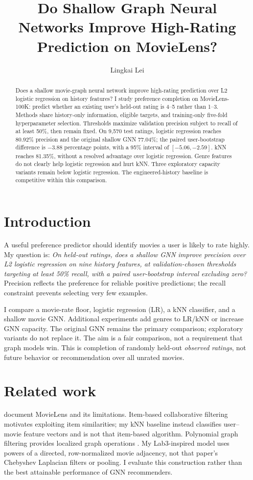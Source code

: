 \documentclass{article}
\title{Do Shallow Graph Neural Networks Improve High-Rating Prediction on MovieLens?}
\author{Lingkai Lei}
\begin{document}
\maketitle

\begin{abstract}
Does a shallow movie-graph neural network improve high-rating prediction over L2 logistic regression on history features? I study preference completion on MovieLens-100K: predict whether an existing user's held-out rating is 4--5 rather than 1--3. Methods share history-only information, eligible targets, and training-only five-fold hyperparameter selection. Thresholds maximize validation precision subject to recall of at least 50\%, then remain fixed. On 9,570 test ratings, logistic regression reaches 80.92\% precision and the original shallow GNN 77.04\%; the paired user-bootstrap difference is $-3.88$ percentage points, with a 95\% interval of $[-5.06,-2.59]$. kNN reaches 81.35\%, without a resolved advantage over logistic regression. Genre features do not clearly help logistic regression and hurt kNN. Three exploratory capacity variants remain below logistic regression. The engineered-history baseline is competitive within this comparison.
\end{abstract}

\section{Introduction}
A useful preference predictor should identify movies a user is likely to rate highly. My question is: \emph{On held-out ratings, does a shallow GNN improve precision over L2 logistic regression on nine history features, at validation-chosen thresholds targeting at least 50\% recall, with a paired user-bootstrap interval excluding zero?} Precision reflects the preference for reliable positive predictions; the recall constraint prevents selecting very few examples.

I compare a movie-rate floor, logistic regression (LR), a kNN classifier, and a shallow movie GNN. Additional experiments add genres to LR/kNN or increase GNN capacity. The original GNN remains the primary comparison; exploratory variants do not replace it. The aim is a fair comparison, not a requirement that graph models win. This is completion of randomly held-out \emph{observed ratings}, not future behavior or recommendation over all unrated movies.

\section{Related work}
\citet{harper2015} document MovieLens and its limitations. Item-based collaborative filtering \citep{sarwar2001} motivates exploiting item similarities; my kNN baseline instead classifies user--movie feature vectors and is not that item-based algorithm. Polynomial graph filtering provides localized graph operations \citep{defferrard2016}. My Lab3-inspired model uses powers of a directed, row-normalized movie adjacency, not that paper's Chebyshev Laplacian filters or pooling. I evaluate this construction rather than the best attainable performance of GNN recommenders.
\end{document}
